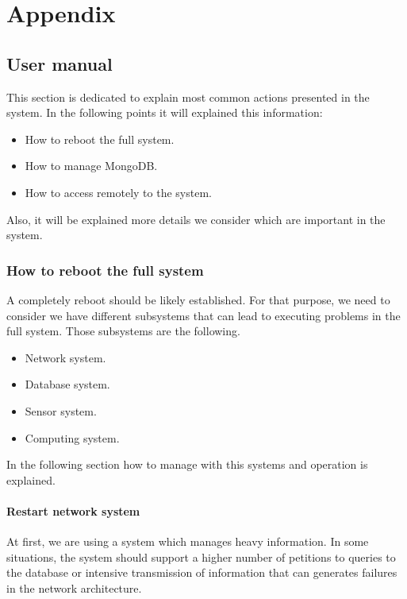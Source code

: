 
\chapter{Appendix}
\newpage

\section{User manual}
This section is dedicated to explain most common actions presented in the system. In the following points it will explained this information:

\begin{itemize}
\item How to reboot the full system.
\item How to manage MongoDB.
\item How to access remotely to the system.
\end{itemize}

Also, it will be explained more details we consider which are important in the system.\\

\subsection{How to reboot the full system}

A completely reboot should be likely established. For that purpose, we need to consider we have different subsystems that can lead to executing problems in the full system. Those subsystems are the following.

\begin{itemize}
\item Network system.
\item Database system.
\item Sensor system.
\item Computing system.
\end{itemize}

In the following section how to manage with this systems and operation is explained.\\

\subsubsection{Restart network system}

At first, we are using a system which manages heavy information. In some situations, the system should support a higher number of petitions to queries to the database or intensive transmission of information that can generates failures in the network architecture.\\

